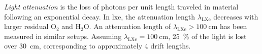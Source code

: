 \emph{Light attenuation} is the loss of photons per unit length traveled in material following an exponential decay.
In \gls{lxe}, the attenuation length $ \lambda_\mathrm{LXe} $ decreases with larger residual $ \mathrm{O}_2 $ and $ \mathrm{H}_2\mathrm{O} $.
An attenuation length of $ \lambda_\mathrm{LXe} \gt \SI{100}{\centi\m} $ has been measured in similar setups\cite{}.  %
Assuming $ \lambda_\mathrm{LXe} = \SI{100}{\centi\m} $, \SI{25}{\%} of the light is lost over \SI{30}{\centi\m}, corresponding to approximately 4 drift lengths.













